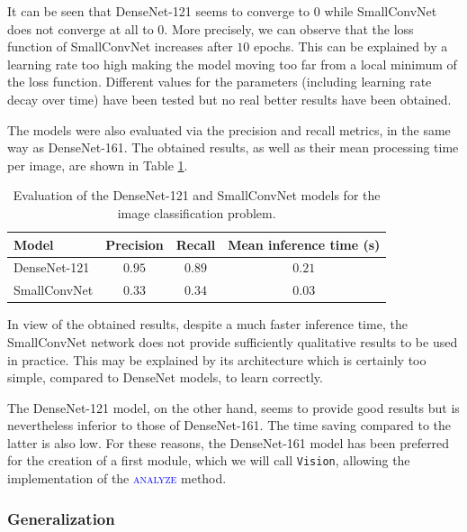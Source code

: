 It can be seen that DenseNet-121 seems to converge to $0$ while SmallConvNet does not converge at all to $\num{0}$. More precisely, we can observe that the loss function of SmallConvNet increases after $\num{10}$ epochs. This can be explained by a learning rate too high making the model moving too far from a local minimum of the loss function. Different values for the parameters (including learning rate decay over time) have been tested but no real better results have been obtained.

The models were also evaluated via the precision and recall metrics, in the same way as DenseNet-161. The obtained results, as well as their mean processing time per image, are shown in Table \ref{tab:06.classification.evaluation}.

\begin{table}[H]
    \centering
    \begin{tabular}{|l|c|c|c|}
        \hline
        \textbf{Model} & \textbf{Precision} & \textbf{Recall} & \textbf{Mean inference time} (s) \\ \hline
        \hline
        DenseNet-121 & $\num{0.95}$ & $\num{0.89}$ & $\num{0.21}$ \\ \hline
        SmallConvNet & $\num{0.33}$ & $\num{0.34}$ & $\num{0.03}$ \\ \hline
    \end{tabular}
    \caption{Evaluation of the DenseNet-121 and SmallConvNet models for the image classification problem.}
    \label{tab:06.classification.evaluation}
\end{table}

In view of the obtained results, despite a much faster inference time, the SmallConvNet network does not provide sufficiently qualitative results to be used in practice. This may be explained by its architecture which is certainly too simple, compared to DenseNet models, to learn correctly.

The DenseNet-121 model, on the other hand, seems to provide good results but is nevertheless inferior to those of DenseNet-161. The time saving compared to the latter is also low. For these reasons, the DenseNet-161 model has been preferred for the creation of a first module, which we will call \texttt{Vision}, allowing the implementation of the \textsc{\textcolor{blue}{analyze}} method.

\subsubsection{Generalization}

